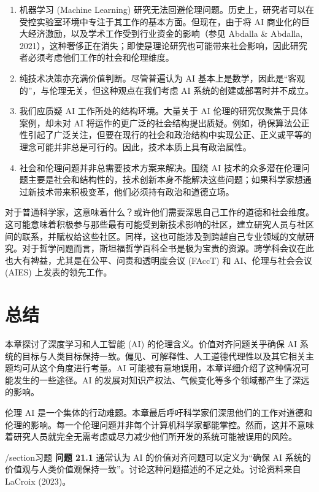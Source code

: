 \documentclass[lang=cn,newtx,10pt,scheme=chinese]{elegantbook}
\begin{document}
\begin{enumerate}
\item 机器学习 (Machine Learning) 研究无法回避伦理问题。历史上，研究者可以在受控实验室环境中专注于其工作的基本方面。但现在，由于将 AI 商业化的巨大经济激励，以及学术工作受到行业资金的影响（参见 Abdalla \& Abdalla, 2021），这种奢侈正在消失；即使是理论研究也可能带来社会影响，因此研究者必须考虑他们工作的社会和伦理维度。
\item 纯技术决策亦充满价值判断。尽管普遍认为 AI 基本上是数学，因此是“客观的”，与伦理无关，但这种观点在我们考虑 AI 系统的创建或部署时并不成立。
\item 我们应质疑 AI 工作所处的结构环境。大量关于 AI 伦理的研究仅聚焦于具体案例，却未对 AI 将运作的更广泛的社会结构提出质疑。例如，确保算法公正性引起了广泛关注，但要在现行的社会和政治结构中实现公正、正义或平等的理念可能并非总是可行的。因此，技术本质上具有政治属性。
\item 社会和伦理问题并非总需要技术方案来解决。围绕 AI 技术的众多潜在伦理问题主要是社会和结构性的，技术创新本身不能解决这些问题；如果科学家想通过新技术带来积极变革，他们必须持有政治和道德立场。
\end{enumerate}

对于普通科学家，这意味着什么？或许他们需要深思自己工作的道德和社会维度。这可能意味着积极参与那些最有可能受到新技术影响的社区，建立研究人员与社区间的联系，并赋权给这些社区。同样，这也可能涉及到跨越自己专业领域的文献研究。对于哲学问题而言，斯坦福哲学百科全书是极为宝贵的资源。跨学科会议在此也大有裨益，尤其是在公平、问责和透明度会议 (FAccT) 和 AI、伦理与社会会议 (AIES) 上发表的领先工作。

\section{总结}
本章探讨了深度学习和人工智能 (AI) 的伦理含义。价值对齐问题关乎确保 AI 系统的目标与人类目标保持一致。偏见、可解释性、人工道德代理性以及其它相关主题均可从这个角度进行考量。AI 可能被有意地误用，本章详细介绍了这种情况可能发生的一些途径。AI 的发展对知识产权法、气候变化等多个领域都产生了深远的影响。

伦理 AI 是一个集体的行动难题。本章最后呼吁科学家们深思他们的工作对道德和伦理的影响。每一个伦理问题并非每个计算机科学家都能掌控。然而，这并不意味着研究人员就完全无需考虑或尽力减少他们所开发的系统可能被误用的风险。

/section{习题}
\textbf{问题 21.1} 通常认为 AI 的价值对齐问题可以定义为“确保 AI 系统的价值观与人类价值观保持一致”。讨论这种问题描述的不足之处。讨论资料来自 LaCroix (2023)。
\end{document}
